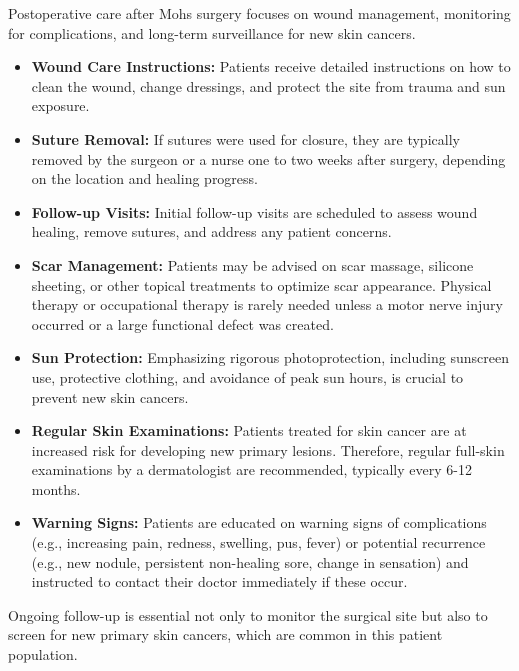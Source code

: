 Postoperative care after Mohs surgery focuses on wound management, monitoring for complications, and long-term surveillance for new skin cancers.

\begin{itemize}
  \item \textbf{Wound Care Instructions:} Patients receive detailed instructions on how to clean the wound, change dressings, and protect the site from trauma and sun exposure.
  
  \item \textbf{Suture Removal:} If sutures were used for closure, they are typically removed by the surgeon or a nurse one to two weeks after surgery, depending on the location and healing progress.
  
  \item \textbf{Follow-up Visits:} Initial follow-up visits are scheduled to assess wound healing, remove sutures, and address any patient concerns.
  
  \item \textbf{Scar Management:} Patients may be advised on scar massage, silicone sheeting, or other topical treatments to optimize scar appearance. Physical therapy or occupational therapy is rarely needed unless a motor nerve injury occurred or a large functional defect was created.
  
  \item \textbf{Sun Protection:} Emphasizing rigorous photoprotection, including sunscreen use, protective clothing, and avoidance of peak sun hours, is crucial to prevent new skin cancers.
  
  \item \textbf{Regular Skin Examinations:} Patients treated for skin cancer are at increased risk for developing new primary lesions. Therefore, regular full-skin examinations by a dermatologist are recommended, typically every 6-12 months.
  
  \item \textbf{Warning Signs:} Patients are educated on warning signs of complications (e.g., increasing pain, redness, swelling, pus, fever) or potential recurrence (e.g., new nodule, persistent non-healing sore, change in sensation) and instructed to contact their doctor immediately if these occur.
\end{itemize}

Ongoing follow-up is essential not only to monitor the surgical site but also to screen for new primary skin cancers, which are common in this patient population.

